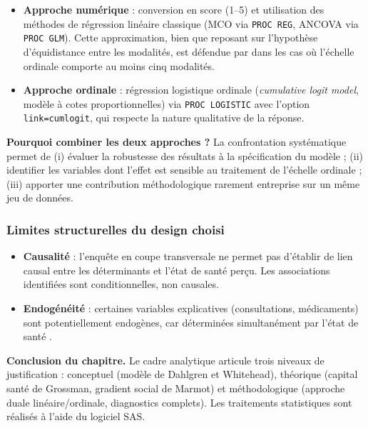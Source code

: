 \documentclass[11pt,a4paper]{memoirerecherche}
\providecommand{\tightlist}{%
  \setlength{\itemsep}{0pt}\setlength{\parskip}{0pt}}
\begin{document}
\begin{itemize}
\tightlist
\item
  \textbf{Approche numérique} : conversion en score (1--5) et utilisation des méthodes de régression linéaire classique (MCO via \texttt{PROC\ REG}, ANCOVA via \texttt{PROC\ GLM}). Cette approximation, bien que reposant sur l'hypothèse d'équidistance entre les modalités, est défendue par \textcite{wooldridge2015} dans les cas où l'échelle ordinale comporte au moins cinq modalités.
\item
  \textbf{Approche ordinale} : régression logistique ordinale (\emph{cumulative logit model}, modèle à cotes proportionnelles) via \texttt{PROC\ LOGISTIC} avec l'option \texttt{link=cumlogit}, qui respecte la nature qualitative de la réponse.
\end{itemize}

\textbf{Pourquoi combiner les deux approches ?} La confrontation systématique permet de (i) évaluer la robustesse des résultats à la spécification du modèle ; (ii) identifier les variables dont l'effet est sensible au traitement de l'échelle ordinale ; (iii) apporter une contribution méthodologique rarement entreprise sur un même jeu de données.

\hypertarget{limites-structurelles-du-design-choisi}{%
\subsubsection{Limites structurelles du design choisi}\label{limites-structurelles-du-design-choisi}}

\begin{itemize}
\tightlist
\item
  \textbf{Causalité} : l'enquête en coupe transversale ne permet pas d'établir de lien causal entre les déterminants et l'état de santé perçu. Les associations identifiées sont conditionnelles, non causales.
\item
  \textbf{Endogénéité} : certaines variables explicatives (consultations, médicaments) sont potentiellement endogènes, car déterminées simultanément par l'état de santé \autocite{grossman1972}.
\end{itemize}

\bigskip

\textbf{Conclusion du chapitre.} Le cadre analytique articule trois niveaux de justification : conceptuel (modèle de Dahlgren et Whitehead), théorique (capital santé de Grossman, gradient social de Marmot) et méthodologique (approche duale linéaire/ordinale, diagnostics complets). Les traitements statistiques sont réalisés à l'aide du logiciel SAS.
\end{document}
